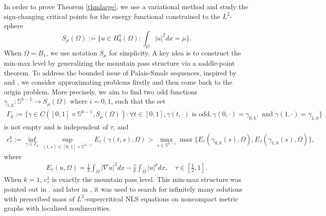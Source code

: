 \documentclass[10pt,a4paper]{article}
\theoremstyle{definition} \theoremstyle{remark}
\numberwithin{equation}{section}
\newcommand{\s}{\mathbb{S}}
\begin{document}
In order to prove Theorem \ref{thmlarge}, we use a variational method and study the sign-changing critical points for the energy functional constrained to the $L^2$-sphere
\begin{equation*}
	S_\mu(\Omega)
	:= \bigl\{u\in H_0^1(\Omega):
	\int_{\Omega}|u|^2 dx=\mu \bigr\}.
\end{equation*}
When $\Omega = B_1$, we use notation $S_\mu$ for simplicity. A key idea is to construct the min-max level by generalizing the mountain pass structure via a saddle-point theorem. To address the bounded issue of Palais-Smale sequences,  inspired by \cite{BCJN} and \cite{Louis}, we consider approximating problems firstly and then come back to the origin problem. More precisely, we aim to find two odd functions $\gamma_{i,k}: \s^{k-1} \to S_\mu(\Omega)$ where $i = 0,1$, such that the set
\begin{align*}
	\Gamma_k := \big\{\gamma \in C([0,1]\times \s^{k-1}, S_\mu(\Omega)): \forall t \in [0,1], \gamma(t,\cdot) \text{ is odd}, \gamma(0,\cdot) = \gamma_{0,k}, \text{ and } \gamma(1,\cdot) = \gamma_{1,k}\big\}
\end{align*}
is not empty and is independent of $\tau$, and
\begin{align*}
	c_\tau^k := \inf_{\gamma \in \Gamma_k}\sup_{(t,s) \in [0,1]\times\s^{k-1}}E_\tau(\gamma(t,s),\Omega) > \max_{s\in \s^{k-1}}\max\big\{ E_\tau(\gamma_{0,k}(s),\Omega), E_\tau(\gamma_{1,k}(s),\Omega)\big\},
\end{align*}
where
\begin{align*}
	E_\tau(u,\Omega) = \frac12 \int_{\Omega}|\nabla u|^2dx - \frac{\tau}p\int_{\Omega} |u|^pdx, \quad \tau \in [\frac12,1].
\end{align*}
When $k = 1$, $c_\tau^1$ is exactly the mountain pass level. This min-max structure was pointed out in \cite[Remark 4.5]{PV}, and later in \cite{CGJT}, it was used to search for infinitely many solutions with prescribed mass of $L^2$-supercritical NLS equations on noncompact metric graphs with localized nonlinearities.

\vskip0.1in
\end{document}
